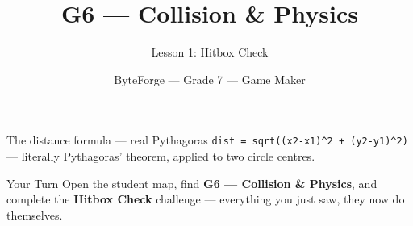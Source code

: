 \documentclass[aspectratio=169]{beamer}
\title{G6 — Collision \& Physics}
\subtitle{Lesson 1: Hitbox Check}
\author{ByteForge --- Grade 7 --- Game Maker}
\date{}
\begin{document}
\begin{frame}
    \titlepage
\end{frame}

\begin{frame}{The distance formula — real Pythagoras}
    \Large
    \texttt{dist = sqrt((x2-x1)\textasciicircum{}2 + (y2-y1)\textasciicircum{}2)} — literally Pythagoras' theorem, applied to two circle centres.

    \begin{center}
    \end{center}
\end{frame}

\begin{frame}{Your Turn}
    \Large
    Open the student map, find \textbf{G6 — Collision \& Physics}, and complete
    the \textbf{Hitbox Check} challenge --- everything you just saw, they now do themselves.
\end{frame}
\end{document}
